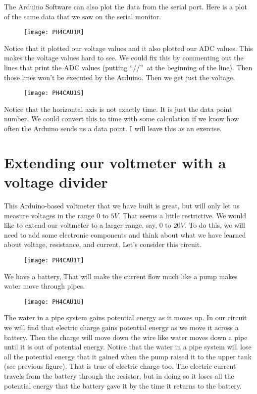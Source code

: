 The Arduino Software can also plot the data from the serial port. Here is a
plot of the same data that we saw on the serial monitor. \begin{figure}[h!]
\texttt{[image: PH4CAU1R]}
\end{figure}Notice that it plotted our
voltage values and it also plotted our ADC values. This makes the voltage
values hard to see. We could fix this by commenting out the lines that print
the ADC values (putting \textquotedblleft //\textquotedblright\ at the
beginning of the line). Then those lines won't be executed by the Arduino.
Then we get just the voltage. \begin{figure}[h!]
\texttt{[image: PH4CAU1S]}
\end{figure}Notice that the horizontal axis
is not exactly time. It is just the data point number. We could convert this
to time with some calculation if we know how often the Arduino sends us a
data point. I will leave this as an exercise.

\section{Extending our voltmeter with a voltage divider\label{Voltmeter with
Voltage Divider}}

This Arduino-based voltmeter that we have built is great, but will only let
us measure voltages in the range $0$ to $5\unit{V}.$ That seems a little
restrictive. We would like to extend our voltmeter to a larger range, say, $%
0 $ to $20\unit{V}.$ To do this, we will need to add some electronic
components and think about what we have learned about voltage, resistance,
and current. Let's consider this circuit.\begin{figure}[h!]
\texttt{[image: PH4CAU1T]}
\end{figure}We have a battery, That will make
the current flow much like a pump makes water move through pipes.

\begin{figure}[h!]
\texttt{[image: PH4CAU1U]}
\end{figure}The water in a pipe system gains
potential energy as it moves up. In our circuit we will find that electric
charge gains potential energy as we move it across a battery. Then the
charge will move down the wire like water moves down a pipe until it is out
of potential energy. Notice that the water in a pipe system will lose all
the potential energy that it gained when the pump raised it to the upper
tank (see previous figure). That is true of electric charge too. The
electric current travels from the battery through the resistor, but in doing
so it loses all the potential energy that the battery gave it by the time it
returns to the battery.

